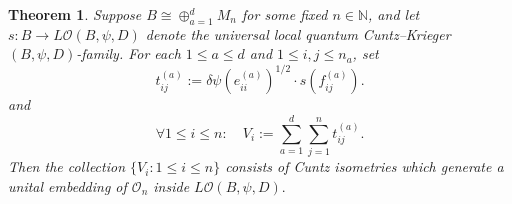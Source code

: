 \documentclass[11pt]{article}
\theoremstyle{plain}
\newtheorem{theorem}[lemma]{Theorem}
\theoremstyle{nonumberplain}
\theoremstyle{plain}
\theoremstyle{nonumberplain}
\newcommand\1{{\bf 1}}
\newcommand\cO{{\mathcal O}}
\newcommand{\<}{\left\langle}
\renewcommand{\>}{\right\rangle}
\begin{document}

\begin{theorem}\label{thm:unital_embedding_of_O_n}
     Suppose $B\cong \oplus_{a=1}^d M_n$ for some fixed $n\in \mathbb{N}$, and let $s:B\to L\cO(B,\psi,D)$ denote the universal local quantum Cuntz--Krieger $(B,\psi,D)$-family. For each $1\leq a\leq d$ and $1\leq i,j \leq n_a$, set 
     \[
     t^{(a)}_{ij}
     :=
     \delta\psi(e_{ii}^{(a)})^{1/2}\cdot s(f_{ij}^{(a)}).
     \] 
     and 
      \[
     \forall 1\leq i\leq n: \quad
     V_i
     :=\sum_{a=1}^d\sum_{j=1}^n t^{(a)}_{ij}.
     \] 
     Then the collection $\{V_i:1\leq i\leq n\}$ 
    consists of Cuntz isometries which generate a unital embedding of $\cO_n$ inside $L\cO(B,\psi,D).$
\end{theorem}

\end{document}
